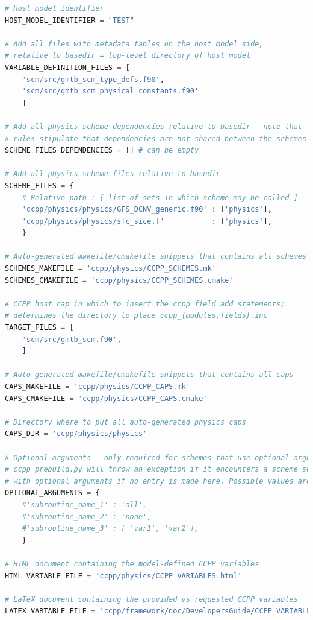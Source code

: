 \begin{lstlisting}[language=python,
                 basicstyle=\scriptsize\ttfamily,
                 label=lst_ccpp_prebuild_config,
                 float=p,
                 caption=CCPP prebuild config for SCM (shortened)]
# Host model identifier
HOST_MODEL_IDENTIFIER = "TEST"

# Add all files with metadata tables on the host model side,
# relative to basedir = top-level directory of host model
VARIABLE_DEFINITION_FILES = [
    'scm/src/gmtb_scm_type_defs.f90',
    'scm/src/gmtb_scm_physical_constants.f90'
    ]

# Add all physics scheme dependencies relative to basedir - note that the CCPP
# rules stipulate that dependencies are not shared between the schemes!
SCHEME_FILES_DEPENDENCIES = [] # can be empty

# Add all physics scheme files relative to basedir
SCHEME_FILES = {
    # Relative path : [ list of sets in which scheme may be called ]
    'ccpp/physics/physics/GFS_DCNV_generic.f90' : ['physics'],
    'ccpp/physics/physics/sfc_sice.f'           : ['physics'],
    }

# Auto-generated makefile/cmakefile snippets that contains all schemes
SCHEMES_MAKEFILE = 'ccpp/physics/CCPP_SCHEMES.mk'
SCHEMES_CMAKEFILE = 'ccpp/physics/CCPP_SCHEMES.cmake'

# CCPP host cap in which to insert the ccpp_field_add statements;
# determines the directory to place ccpp_{modules,fields}.inc
TARGET_FILES = [
    'scm/src/gmtb_scm.f90',
    ]

# Auto-generated makefile/cmakefile snippets that contains all caps
CAPS_MAKEFILE = 'ccpp/physics/CCPP_CAPS.mk'
CAPS_CMAKEFILE = 'ccpp/physics/CCPP_CAPS.cmake'

# Directory where to put all auto-generated physics caps
CAPS_DIR = 'ccpp/physics/physics'

# Optional arguments - only required for schemes that use optional arguments.
# ccpp_prebuild.py will throw an exception if it encounters a scheme subroutine
# with optional arguments if no entry is made here. Possible values are:
OPTIONAL_ARGUMENTS = {
    #'subroutine_name_1' : 'all',
    #'subroutine_name_2' : 'none',
    #'subroutine_name_3' : [ 'var1', 'var2'],
    }

# HTML document containing the model-defined CCPP variables
HTML_VARTABLE_FILE = 'ccpp/physics/CCPP_VARIABLES.html'

# LaTeX document containing the provided vs requested CCPP variables
LATEX_VARTABLE_FILE = 'ccpp/framework/doc/DevelopersGuide/CCPP_VARIABLES.tex'


\end{lstlisting}

